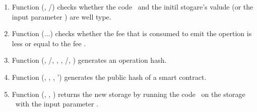 \documentclass[a4paper]{llncs}
\begin{document}
\begin{enumerate}
    \item Function \CHECKPRG (\CODE, {\INIT /\PARAMETER}) checks whether the code \CODE\ and the initil stogare's valude (or the input parameter \PARAMETER) are well type.
    \item Function \CHECKGAS (...) checks whether the fee that is consumed to emit the opertion is less or equal to the fee \MTEZ. 
    \item Function \GENERATEOPH (\PUK, {\ADDR /\CODE}, \NTEZ, \MTEZ, {\INIT /\PARAMETER}, \TIME) generates an operation hash.

    \item Function \GENERATEHASH (\CODE, \INIT, \TIME, \TIME')  generates the public hash of a smart contract.
     
    \item Function \UPDATESTORAGE(\STORAGE, \CODE,  \PARAMETER) returns the new storage by running the code \CODE\ on the  storage  \STORAGE\ with  the input parameter \PARAMETER.
\end{enumerate}
\end{document}
